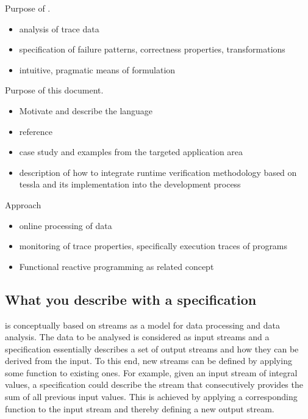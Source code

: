 \begin{enumerate}
   
\end{enumerate}


Purpose of \tessla.

\begin{itemize}
  \item analysis of trace data
  \item specification of failure patterns, correctness properties, transformations
  \item intuitive, pragmatic means of formulation 
\end{itemize}

Purpose of this document.
\begin{itemize}
  \item Motivate and describe the language
  \item reference
  \item case study and examples from the targeted application area
  \item description of how to integrate runtime verification methodology based on tessla and its implementation into the development process
\end{itemize}

Approach
  \begin{itemize}
    \item online processing of data
    \item monitoring of trace properties, specifically execution traces of programs
    \item Functional reactive programming as related concept
  \end{itemize}

\subsection{What you describe with a \tessla specification}

\tessla is conceptually based on streams as a model for data processing and data analysis. 
The data to be analysed is considered as input streams and a \tessla specification essentially describes a set of output streams and how they can be derived from the input.
To this end, new streams can be defined by applying some function to existing ones.
For example, given an input stream of integral values, a \tessla specification could describe the stream that consecutively provides the sum of all previous input values.
This is achieved by applying a corresponding function to the input stream and thereby defining a new output stream.

